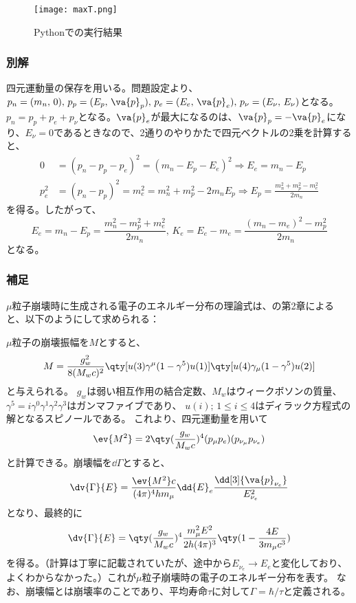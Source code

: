 \documentclass[a4paper,11pt,titlepage,uplatex]{jsarticle}
\begin{document}
\begin{figure}[H]
	\centering
	\texttt{[image: maxT.png]}
	\caption{Pythonでの実行結果}
	\label{fig:max_T}
\end{figure}

\subsubsection*{別解}
四元運動量の保存を用いる。問題設定より、$p_n = (m_n,\,0),\,p_p=(E_p,\,\va{p}_p),\,p_e=(E_e,\,\va{p}_e),\,p_{\nu}=(E_{\nu},\,E_{\nu})$となる。
$p_n = p_p + p_e + p_\nu$となる。$\va{p}_e$が最大になるのは、$\va{p}_p = -\va{p}_e$になり、$E_{\nu}=0$であるときなので、2通りのやりかたで四元ベクトルの2乗を計算すると、
\begin{align}
	0     & = (p_n-p_p-p_e)^2 = (m_n - E_p - E_e)^2 \Longrightarrow E_e = m_n-E_p                                 \\
	p^2_e & = (p_n-p_p)^2 = m_e^2 = m_n^2 + m_p^2 - 2m_nE_p  \Longrightarrow E_p = \frac{m_n^2+m_p^2-m_e^2}{2m_n}
\end{align}
を得る。したがって、
\begin{equation}
	E_e = m_n - E_p = \frac{m_n^2-m_p^2+m_e^2}{2m_n},\,K_e = E_e-m_e = \frac{(m_n-m_e)^2 - m_p^2}{2m_n}
\end{equation}
となる。
\subsubsection*{補足}
$\mu$粒子崩壊時に生成される電子のエネルギー分布の理論式は、\cite{6}の第2章によると、以下のようにして求められる：

$\mu$粒子の崩壊振幅を$M$とすると、
\begin{equation}
	M =\frac{g_w^2}{8(M_wc)^2}\qty[u(3)\gamma^\mu(1-\gamma^5)u(1)]\qty[u(4)\gamma_\mu(1-\gamma^5)u(2)]
\end{equation}
と与えられる。
$g_w$は弱い相互作用の結合定数、$M_w$はウィークボソンの質量、$\gamma^5=i\gamma^0\gamma^1\gamma^2\gamma^3$はガンマファイブであり、
$u(i);\,1\leq i\leq 4$はディラック方程式の解となるスピノールである。
これより、四元運動量を用いて
\begin{equation}
	\ev{M^2} = 2\qty(\frac{g_w}{M_wc})^4(p_\mu p_e)(p_{\nu_\mu}p_{\nu_e})
\end{equation}
と計算できる。崩壊幅を$\dd{\Gamma}$とすると、
\begin{equation}
	\dv{\Gamma}{E} = \frac{\ev{M^2}c}{(4\pi)^4hm_{\mu}}\dd{E}_e\frac{\dd[3]{\va{p}_{\nu_{e}}}}{E_{\nu_{e}}^2}
\end{equation}
となり、最終的に
\begin{equation}
	\dv{\Gamma}{E} = \qty(\frac{g_w}{M_wc})^4\frac{m_\mu^2 E^2}{2h(4\pi)^3}\qty(1-\frac{4E}{3m_{\mu}c^3})
\end{equation}
を得る。（計算は丁寧に記載されていたが、途中から$E_{\nu_e}\to E_{e}$と変化しており、よくわからなかった。）これが$\mu$粒子崩壊時の電子のエネルギー分布を表す。
なお、崩壊幅とは崩壊率のことであり、平均寿命$\tau$に対して$\Gamma = \hbar/\tau$と定義される。
\end{document}
